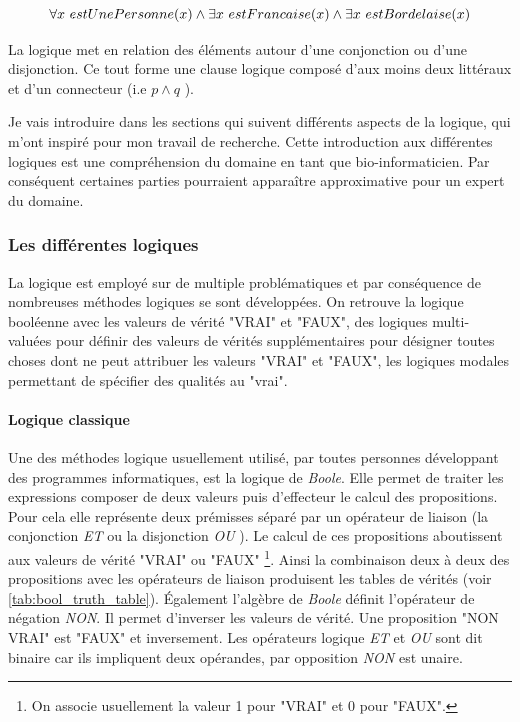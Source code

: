 \begin{refsegment}
    \begin{equation*}
        \forall x~estUnePersonne(x) \land \exists x~estFrancaise(x) \land \exists x~estBordelaise(x) \stepcounter{equation}
    \end{equation*}
    
    
    La logique met en relation des éléments autour d'une conjonction ou d'une disjonction. Ce tout forme une clause logique composé d'aux moins deux littéraux et d'un connecteur (i.e $p \land q$ ).
    
    Je vais introduire dans les sections qui suivent différents aspects de la logique, qui m'ont inspiré pour mon travail de recherche. Cette introduction aux différentes logiques est une compréhension du domaine en tant que bio-informaticien. Par conséquent certaines parties pourraient apparaître approximative pour un expert du domaine.
    
    \subsubsection{Les différentes logiques}
    
    La logique est employé sur de multiple problématiques et par conséquence de nombreuses méthodes logiques se sont développées. On retrouve la logique booléenne avec les valeurs de vérité "VRAI" et "FAUX", des logiques multi-valuées pour définir des valeurs de vérités supplémentaires pour désigner toutes choses dont ne peut attribuer les valeurs  "VRAI" et "FAUX", les logiques modales permettant de spécifier des qualités au "vrai".
    
    \paragraph{Logique classique}
    
    Une des méthodes logique usuellement utilisé, par toutes personnes développant des programmes informatiques, est la logique de \textit{Boole}. Elle permet de traiter les expressions composer de deux valeurs puis d'effecteur le calcul des propositions. Pour cela elle représente deux prémisses séparé par un opérateur de liaison (la conjonction \textit{ET} ou la disjonction \textit{OU} ). Le calcul de ces propositions aboutissent aux valeurs de vérité "VRAI" ou "FAUX" \footnote{On associe usuellement la valeur 1 pour "VRAI" et 0 pour "FAUX".}. Ainsi la combinaison deux à deux des propositions avec les opérateurs de liaison produisent les tables de vérités (voir \ref{tab:bool_truth_table}). Également l'algèbre de \textit{Boole} définit l'opérateur de négation \textit{NON}. Il permet d'inverser les valeurs de vérité. Une proposition "NON VRAI" est "FAUX" et inversement. Les opérateurs logique \textit{ET} et \textit{OU} sont dit binaire car ils impliquent deux opérandes, par opposition \textit{NON} est unaire.
    

\end{refsegment}
